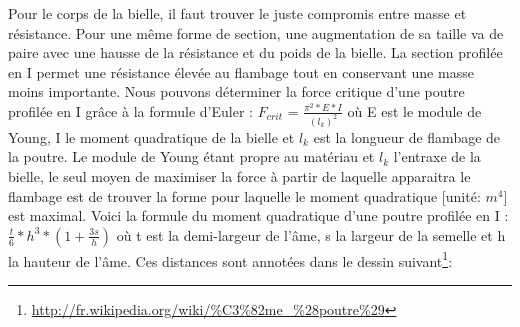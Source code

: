 \documentclass[a4paper,oneside,12pt]{report}
\begin{document}
 Pour le corps de la bielle, il faut trouver le juste compromis entre masse et résistance. Pour une même forme de section, une augmentation de sa taille va de paire avec une hausse de la résistance et du poids de la bielle. La section profilée en I permet une résistance élevée au flambage tout en conservant une masse moins importante. Nous pouvons déterminer la force critique d'une poutre profilée en I grâce à la formule d'Euler : $F_{crit}$ = $\frac{\pi^2 *E*I}{(l_k)^2}$ où E est le module de Young, I le moment quadratique de la bielle et $l_k$ est la longueur de flambage de la poutre. Le module de Young étant propre au matériau et $l_k$ l'entraxe de la bielle, le seul moyen de maximiser la force à partir de laquelle apparaitra le flambage est de trouver la forme pour laquelle le moment quadratique [unité: $m^4$] est maximal. Voici la formule du moment quadratique d'une poutre profilée en I : $\frac{t}{6}*h^3*(1+\frac{3s}{h})$ où t est la demi-largeur de l'âme, s la largeur de la semelle et h la hauteur de l'âme. Ces distances sont annotées dans le dessin suivant\footnote{\url{http://fr.wikipedia.org/wiki/\%C3\%82me_\%28poutre\%29}}:
\end{document}
